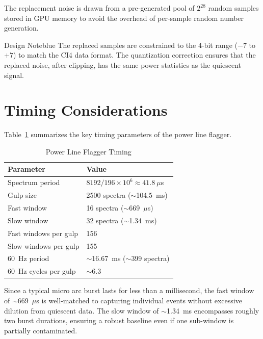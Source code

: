The replacement noise is drawn from a pre-generated pool of $2^{28}$ random samples stored in GPU memory to avoid the overhead of per-sample random number generation.

\begin{calloutBox}{Design Note}{blue}
The replaced samples are constrained to the 4-bit range ($-7$ to $+7$) to match the CI4 data format. The quantization correction ensures that the replaced noise, after clipping, has the same power statistics as the quiescent signal.
\end{calloutBox}

\section{Timing Considerations}

Table~\ref{tab:flagger-timing} summarizes the key timing parameters of the power line flagger.

\begin{table}[htbp]
    \centering
    \caption{Power Line Flagger Timing}
    \label{tab:flagger-timing}
    \begin{tabular}{ll}
        \toprule
        \textbf{Parameter} & \textbf{Value} \\
        \midrule
        Spectrum period & $8192 / 196\times10^6 \approx 41.8~\mu$s \\
        Gulp size & 2500 spectra ($\sim$104.5~ms) \\
        Fast window & 16 spectra ($\sim$669~$\mu$s) \\
        Slow window & 32 spectra ($\sim$1.34~ms) \\
        Fast windows per gulp & 156 \\
        Slow windows per gulp & 155 \\
        60~Hz period & $\sim$16.67~ms ($\sim$399 spectra) \\
        60~Hz cycles per gulp & $\sim$6.3 \\
        \bottomrule
    \end{tabular}
\end{table}

Since a typical micro arc burst lasts for less than a millisecond, the fast window of $\sim$669~$\mu$s is well-matched to capturing individual events without excessive dilution from quiescent data. The slow window of $\sim$1.34~ms encompasses roughly two burst durations, ensuring a robust baseline even if one sub-window is partially contaminated.


